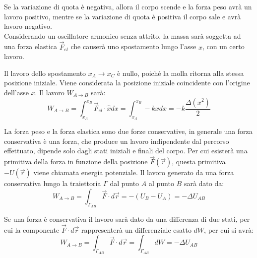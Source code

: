 \documentclass{article}
\numberwithin{equation}{subsection}
\begin{document}
Se la variazione di quota è negativa, allora il corpo 
scende e la forza peso avrà un lavoro positivo, mentre 
se la variazione di quota è positiva il corpo sale e avrà 
lavoro negativo.
\\
Considerando un oscillatore armonico senza attrito, la massa 
sarà soggetta ad una forza elastica $\vec{F}_{el}$ che causerà uno 
spostamento lungo l'asse $x$, con un certo lavoro.
\begin{center}\end{center} 
Il lavoro dello spostamento $x_A\to x_C$ è nullo, poiché la molla 
ritorna alla stessa posizione iniziale. Viene considerata la posizione 
iniziale coincidente con l'origine dell'asse $x$. 
Il lavoro $W_{A\to B}$ sarà:
\begin{equation}
    W_{A\to B}=\displaystyle\int_{x_A}^{x_B}\vec{F}_{el}\cdot\hat{x}dx=\int_{x_A}^{x_B}-kxdx=-k\frac{\Delta( x^{2})}{2}
\end{equation}

La forza peso e la forza elastica sono due forze conservative, in 
generale una forza conservativa è una forza, che produce un lavoro 
indipendente dal percorso effettuato, dipende solo dagli stati iniziali 
e finali del corpo. Per cui esisterà una primitiva della forza in funzione della posizione $\vec{F}(\vec{r})$, questa primitiva $-U(\vec{r})$ 
viene chiamata energia potenziale. Il lavoro generato da una forza conservativa lungo 
la traiettoria $\Gamma$ dal punto $A$ al punto $B$ sarà dato da: 
\begin{equation}
    W_{A\to B}=\displaystyle\int_{\Gamma_{AB}}\vec{F}\cdot d\vec{r}=-\left(U_B-U_A\right)=-\Delta U_{AB}
\end{equation}

Se una forza è conservativa il lavoro sarà dato da una differenza di due stati, per cui la componente $\vec{F}\cdot d\vec{r}$ rappresenterà un differenziale esatto $dW$, per 
cui si avrà: 
\begin{equation}
    W_{A\to B}=\displaystyle\int_{\Gamma_{AB}}\vec{F}\cdot  d\vec{r}=\int_{\Gamma_{AB}}dW=-\Delta U_{AB}
\end{equation}
\end{document}

